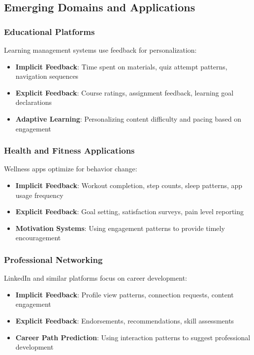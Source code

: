 \subsection{Emerging Domains and Applications}

\subsubsection{Educational Platforms}

Learning management systems use feedback for personalization:

\begin{itemize}
    \item \textbf{Implicit Feedback}: Time spent on materials, quiz attempt patterns, navigation sequences
    \item \textbf{Explicit Feedback}: Course ratings, assignment feedback, learning goal declarations
    \item \textbf{Adaptive Learning}: Personalizing content difficulty and pacing based on engagement
\end{itemize}

\subsubsection{Health and Fitness Applications}

Wellness apps optimize for behavior change:

\begin{itemize}
    \item \textbf{Implicit Feedback}: Workout completion, step counts, sleep patterns, app usage frequency
    \item \textbf{Explicit Feedback}: Goal setting, satisfaction surveys, pain level reporting
    \item \textbf{Motivation Systems}: Using engagement patterns to provide timely encouragement
\end{itemize}

\subsubsection{Professional Networking}

LinkedIn and similar platforms focus on career development:

\begin{itemize}
    \item \textbf{Implicit Feedback}: Profile view patterns, connection requests, content engagement
    \item \textbf{Explicit Feedback}: Endorsements, recommendations, skill assessments
    \item \textbf{Career Path Prediction}: Using interaction patterns to suggest professional development
\end{itemize}

